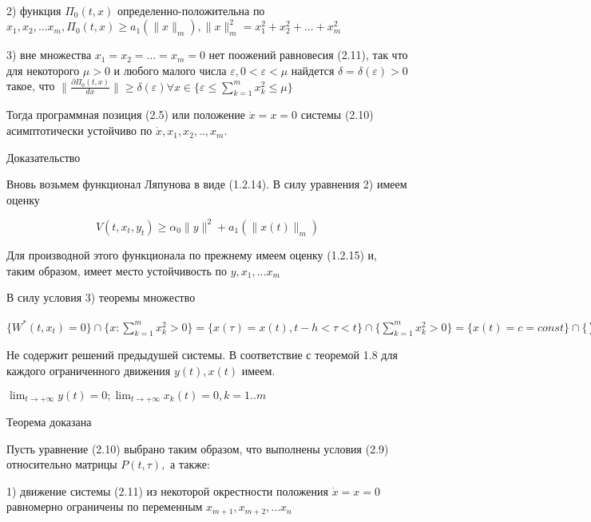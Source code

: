 {\begin{theorem}
2) функция $\Pi_0 (t, x)$ определенно-положительна по $x_1, x_2, ... x_m, \Pi_0(t, x) \ge a_1 (\| x \|_m), \| x \|^2_m = x_1^2 + x_2^2 + ... + x_m^2$ 

3) вне множества ${x_1 = x_2 = ... = x_m = 0}$ нет поожений равновесия (2.11), так что для некоторого $\mu > 0$ и любого малого числа  $\varepsilon, 0 < \varepsilon < \mu$ найдется $\delta = \delta(\varepsilon) > 0$ такое, что $\| \frac{\partial \Pi_0 (t, x)}{dx} \| \ge \delta(\varepsilon) \forall x \in \lbrace \varepsilon \le \sum_{k = 1}^{m} x_k^2 \le \mu \rbrace$

Тогда программная позиция (2.5) или положение $\dot x = x = 0$ системы (2.10) асимптотически устойчиво по $\dot x, x_1, x_2,.., x_m.$
\end{theorem}

Доказательство 

Вновь возьмем функционал Ляпунова в виде (1.2.14). В силу уравнения 2) имеем оценку

\begin{equation}
V(t, x_t, y_t) \ge \alpha_0 \| y \| ^2 + a_1 (\| x(t) \|_m)
\end{equation}

Для производной этого функционала по прежнему имеем оценку (1.2.15) и, таким образом, имеет место устойчивость по $y, x_1, ... x_m$

В силу условия 3) теоремы множество 

$ \lbrace W^{*} (t, x_t) = 0 \rbrace \cap \lbrace x : \sum_{k = 1}^{m} x_k^2 > 0 \rbrace = \lbrace x(\tau) = x(t), t - h < \tau < t \rbrace \cap \lbrace \sum_{k = 1}^{m} x_k^2 > 0 \rbrace = \lbrace x(t) = c = const \rbrace \cap \lbrace \sum_{k = 1}^{m} x_k^2 > 0 \rbrace = \lbrace x: \frac{\partial \Pi^{*} (x)}{\partial x} = 0 \rbrace \cap \lbrace \sum_{k = 1}^{m} x_k^2 > 0 \rbrace$

Не содержит решений предыдушей системы. В соответствие с теоремой 1.8 для каждого ограниченного движения $y(t), x(t)$ имеем.

$\lim_{t \to + \infty} y(t) = 0; \lim_{t \to + \infty} x_k (t) = 0, k = 1..m$

Теорема доказана

\begin{theorem}\label{t-1.11}
Пусть уравнение (2.10) выбрано таким образом, что выполнены условия (2.9) относительно матрицы $P(t, \tau),$ а также: 

1) движение системы (2.11) из некоторой окрестности положения $\dot x = x = 0$ равномерно ограничены по переменным $x_{m+1}, x_{m+2},... x_n$


\end{theorem}}
